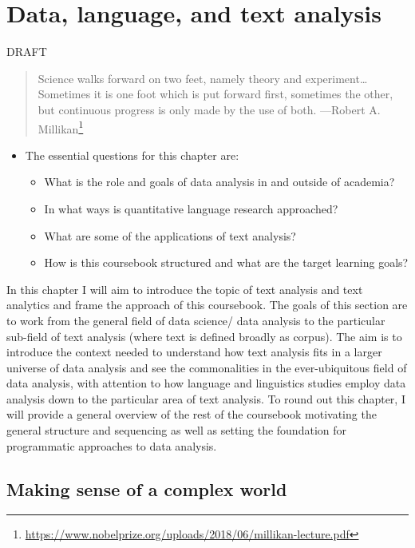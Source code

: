 \documentclass[
]{article}
\DeclareRobustCommand{\href}[2]{#2\footnote{\url{#1}}}
\providecommand{\tightlist}{%
  \setlength{\itemsep}{0pt}\setlength{\parskip}{0pt}}
\newenvironment{rmdblock}[1]
  {\begin{shaded*}
  \begin{itemize}
  \renewcommand{\labelitemi}{
    \raisebox{-.5\height}[0pt][0pt]{
      {\setkeys{Gin}{width=2em,keepaspectratio}\texttt{[image: assets/images/\#1]}}
    }
  }
  \item
  }
  {
  \end{itemize}
  \end{shaded*}
  }
\newenvironment{rmdkey}
  {\begin{rmdblock}{key}}
  {\end{rmdblock}}
\begin{document}
\hypertarget{data-language-and-text-analysis}{%
\section{Data, language, and text analysis}\label{data-language-and-text-analysis}}

DRAFT

\begin{quote}
Science walks forward on two feet, namely theory and experiment\ldots Sometimes it is one foot which is put forward first, sometimes the other, but continuous progress is only made by the use of both.
---\href{https://www.nobelprize.org/uploads/2018/06/millikan-lecture.pdf}{Robert A. Millikan} \citeyearpar{Millikan1923}
\end{quote}

\begin{rmdkey}
The essential questions for this chapter are:

\begin{itemize}
\tightlist
\item
  What is the role and goals of data analysis in and outside of
  academia?
\item
  In what ways is quantitative language research approached?
\item
  What are some of the applications of text analysis?
\item
  How is this coursebook structured and what are the target learning
  goals?
\end{itemize}
\end{rmdkey}

In this chapter I will aim to introduce the topic of text analysis and text analytics and frame the approach of this coursebook. The goals of this section are to work from the general field of data science/ data analysis to the particular sub-field of text analysis (where text is defined broadly as corpus). The aim is to introduce the context needed to understand how text analysis fits in a larger universe of data analysis and see the commonalities in the ever-ubiquitous field of data analysis, with attention to how language and linguistics studies employ data analysis down to the particular area of text analysis. To round out this chapter, I will provide a general overview of the rest of the coursebook motivating the general structure and sequencing as well as setting the foundation for programmatic approaches to data analysis.

\hypertarget{making-sense-of-a-complex-world}{%
\subsection{Making sense of a complex world}\label{making-sense-of-a-complex-world}}
\end{document}
